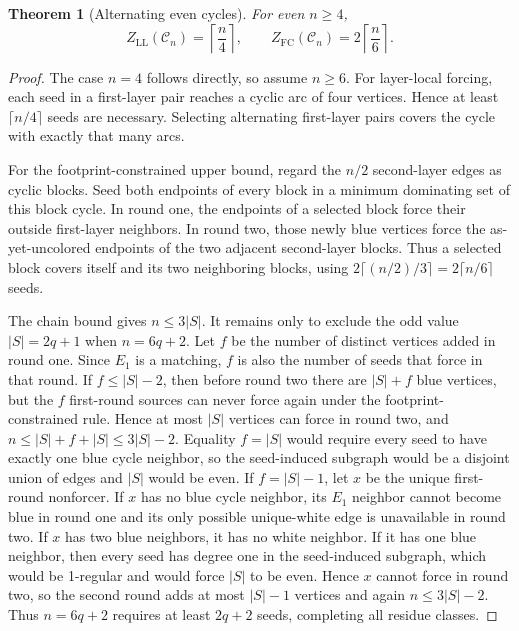 \documentclass[11pt]{article}
\newtheorem{theorem}{Theorem}[section]
\theoremstyle{definition}
\theoremstyle{remark}
\newcommand{\calC}{\mathcal{C}}
\newcommand{\LL}{\mathrm{LL}}
\newcommand{\FC}{\mathrm{FC}}
\begin{document}
\begin{theorem}[Alternating even cycles]\label{thm:cycle}
For even $n\ge4$,
\[
 Z_{\LL}(\calC_n)=\left\lceil\frac n4\right\rceil,
 \qquad
 Z_{\FC}(\calC_n)=2\left\lceil\frac n6\right\rceil.
\]
\end{theorem}

\begin{proof}
The case $n=4$ follows directly, so assume $n\ge6$.  For layer-local forcing,
each seed in a first-layer pair reaches a cyclic arc
of four vertices.  Hence at least $\lceil n/4\rceil$ seeds are necessary.
Selecting alternating first-layer pairs covers the cycle with exactly that
many arcs.

For the footprint-constrained upper bound, regard the $n/2$ second-layer
edges as cyclic blocks.  Seed both endpoints of every block in a minimum
dominating set of this block cycle.  In round one, the endpoints of a selected
block force their outside first-layer neighbors.  In round two, those newly
blue vertices force the as-yet-uncolored endpoints of the two adjacent
second-layer blocks.  Thus a selected block covers itself and its two
neighboring blocks, using
$2\lceil(n/2)/3\rceil=2\lceil n/6\rceil$ seeds.

The chain bound gives $n\le3|S|$.  It remains only to exclude the odd value
$|S|=2q+1$ when $n=6q+2$.  Let $f$ be the number of distinct vertices added
in round one.  Since $E_1$ is a matching, $f$ is also the number of seeds
that force in that round.  If
$f\le |S|-2$, then before round two there are $|S|+f$ blue vertices, but the
$f$ first-round sources can never force again under the footprint-constrained
rule.  Hence at most $|S|$ vertices can force in round two, and
$n\le |S|+f+|S|\le3|S|-2$.  Equality $f=|S|$ would require every seed to
have exactly one blue cycle neighbor, so the seed-induced subgraph would be
a disjoint union of edges and $|S|$ would be even.  If $f=|S|-1$, let $x$ be
the unique first-round nonforcer.  If $x$ has no blue cycle neighbor, its
$E_1$ neighbor cannot become blue in round one and its only possible
unique-white edge is unavailable in round two.  If $x$ has two blue
neighbors, it has no white neighbor.  If it has one blue neighbor, then every
seed has degree one in the seed-induced subgraph, which would be 1-regular
and would force $|S|$ to be even.  Hence $x$ cannot force in round two, so the
second round adds at most $|S|-1$ vertices and again
$n\le3|S|-2$.  Thus $n=6q+2$ requires at least $2q+2$ seeds, completing all
residue classes.
\end{proof}
\end{document}

